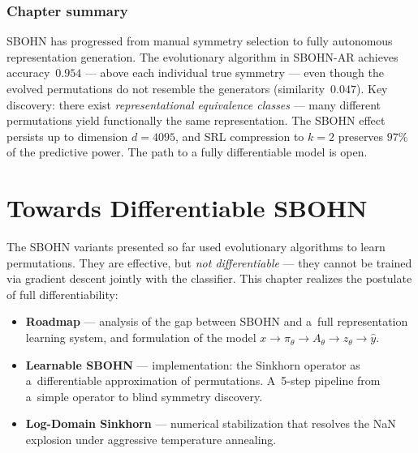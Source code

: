 \documentclass[11pt,a4paper]{report}
\begin{document}


\subsection*{Chapter summary}
SBOHN has progressed from manual symmetry selection to fully autonomous representation generation. The evolutionary algorithm in SBOHN-AR achieves accuracy~$0.954$ --- above each individual true symmetry --- even though the evolved permutations do not resemble the generators (similarity~$0.047$). Key discovery: there exist \emph{representational equivalence classes} --- many different permutations yield functionally the same representation. The SBOHN effect persists up to dimension $d{=}4095$, and SRL compression to $k{=}2$ preserves $97\%$ of the predictive power. The path to a fully differentiable model is open.

\newpage


\chapter{Towards Differentiable SBOHN}

The SBOHN variants presented so far used evolutionary algorithms to learn permutations. They are effective, but \emph{not differentiable} --- they cannot be trained via gradient descent jointly with the classifier. This chapter realizes the postulate of full differentiability:

\begin{itemize}
\item \textbf{Roadmap} --- analysis of the gap between SBOHN and a~full representation learning system, and formulation of the model $x \to \pi_\theta \to A_\theta \to z_\theta \to \hat{y}$.
\item \textbf{Learnable SBOHN} --- implementation: the Sinkhorn operator as a~differentiable approximation of permutations. A~5-step pipeline from a~simple operator to blind symmetry discovery.
\item \textbf{Log-Domain Sinkhorn} --- numerical stabilization that resolves the NaN explosion under aggressive temperature annealing.
\end{itemize}
\end{document}
